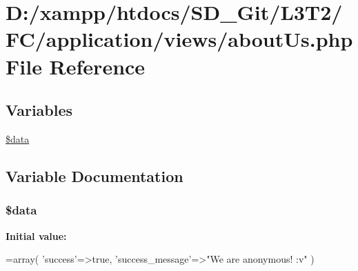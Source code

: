 \hypertarget{about_us_8php}{}\section{D\+:/xampp/htdocs/\+S\+D\+\_\+\+Git/\+L3\+T2/\+F\+C/application/views/about\+Us.php File Reference}
\label{about_us_8php}
\subsection*{Variables}
\begin{DoxyCompactItemize}
\item 
\hyperlink{about_us_8php_a6efc15b5a2314dd4b5aaa556a375c6d6}{\$data}
\end{DoxyCompactItemize}


\subsection{Variable Documentation}
\hypertarget{about_us_8php_a6efc15b5a2314dd4b5aaa556a375c6d6}{}
\subsubsection[{\$data}]{\setlength{\rightskip}{0pt plus 5cm}\$data}\label{about_us_8php_a6efc15b5a2314dd4b5aaa556a375c6d6}
{\bfseries Initial value\+:}
\begin{DoxyCode}
=array(
        \textcolor{stringliteral}{'success'}=>\textcolor{keyword}{true},
        \textcolor{stringliteral}{'success\_message'}=>\textcolor{stringliteral}{"We are anonymous! :v"}
    )
\end{DoxyCode}
